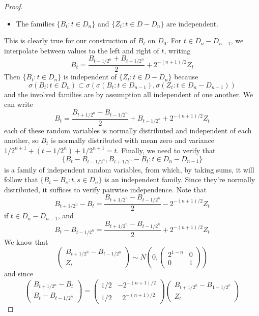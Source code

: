 \begin{proof}
\begin{itemize}
        \item The families $\{ B_t: t \in D_n \}$ and $\{ Z_t: t \in D - D_n \}$ are independent.
    \end{itemize}
    This is clearly true for our construction of $B_t$ on $D_0$. For $t \in D_n - D_{n-1}$, we interpolate between values to the left and right of $t$, writing
    \[ B_t = \frac{B_{t - 1/2^n} + B_{t + 1/2^n}}{2} + 2^{-(n+1)/2} Z_t \]
    Then $\{ B_t: t \in D_n \}$ is independent of $\{ Z_t: t \in D - D_n \}$ because
    \[ \sigma(B_t: t \in D_n) \subset \sigma(\sigma(B_t: t \in D_{n-1}), \sigma(Z_t: t \in D_n - D_{n-1})) \]
    and the involved families are by assumption all independent of one another. We can write
    \[ B_t = \frac{B_{t + 1/2^n} - B_{t - 1/2^n}}{2} + B_{t-1/2^n} + 2^{-(n+1)/2} Z_t \]
    each of these random variables is normally distributed and independent of each another, so $B_t$ is normally distributed with mean zero and variance $1/2^{n+1} + (t - 1/2^n) + 1/2^{n+1} = t$. Finally, we need to verify that
    \[ \{ B_t - B_{t-1/2^n}, B_{t + 1/2^n} - B_t : t \in D_n - D_{n-1} \} \]
    is a family of independent random variables, from which, by taking sums, it will follow that $\{ B_t - B_s: t,s \in D_n \}$ is an independent family. Since they're normally distributed, it suffices to verify pairwise independence. Note that
    \[ B_{t + 1/2^n} - B_t = \frac{B_{t + 1/2^n} - B_{t - 1/2^n}}{2} - 2^{-(n+1)/2} Z_t \]
    if $t \in D_n - D_{n-1}$, and
    \[ B_t - B_{t-1/2^n} = \frac{B_{t + 1/2^n} - B_{t - 1/2^n}}{2} + 2^{-(n+1)/2} Z_t \]
    We know that
    \[ \begin{pmatrix} B_{t+1/2^n} - B_{t-1/2^n} \\ Z_t \end{pmatrix} \sim N \left( 0, \begin{pmatrix} 2^{1-n} & 0 \\ 0 & 1 \end{pmatrix} \right) \]
    and since
    \[ \begin{pmatrix} B_{t + 1/2^n} - B_t \\ B_t - B_{t-1/2^n} \end{pmatrix} = \begin{pmatrix} 1/2 & -2^{-(n+1)/2} \\ 1/2 &\ \ \ 2^{-(n+1)/2} \end{pmatrix} \begin{pmatrix} B_{t+1/2^n} - B_{1-1/2^n} \\ Z_t \end{pmatrix} \]

\end{proof}
